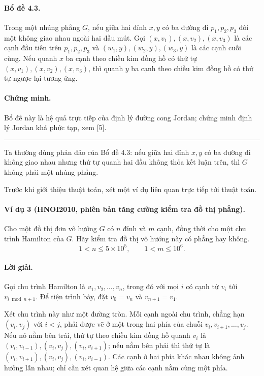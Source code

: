 \documentclass[11pt]{article}
\begin{document}
\paragraph{Bổ đề 4.3.}
Trong một nhúng phẳng $G$, nếu giữa hai đỉnh $x,y$ có ba đường đi
$p_1,p_2,p_3$ đôi một không giao nhau ngoài hai đầu mút. Gọi
$(x,v_1),(x,v_2),(x,v_3)$ là các cạnh đầu tiên trên $p_1,p_2,p_3$ và
$(w_1,y),(w_2,y),(w_3,y)$ là các cạnh cuối cùng. Nếu quanh $x$ ba cạnh theo
chiều kim đồng hồ có thứ tự $(x,v_1),(x,v_2),(x,v_3)$, thì quanh $y$ ba cạnh
theo chiều kim đồng hồ có thứ tự ngược lại tương ứng.

\paragraph{Chứng minh.}
Bổ đề này là hệ quả trực tiếp của định lý đường cong Jordan; chứng minh định lý
Jordan khá phức tạp, xem [5].
\hfill\rule{0.55em}{0.55em}

Ta thường dùng phản đảo của Bổ đề 4.3: nếu giữa hai đỉnh $x,y$ có ba đường đi
không giao nhau nhưng thứ tự quanh hai đầu không thỏa kết luận trên, thì $G$
không phải một nhúng phẳng.

Trước khi giới thiệu thuật toán, xét một ví dụ liên quan trực tiếp tới thuật
toán.

\paragraph{Ví dụ 3 (HNOI2010, phiên bản tăng cường kiểm tra đồ thị phẳng).}
Cho một đồ thị đơn vô hướng $G$ có $n$ đỉnh và $m$ cạnh, đồng thời cho một chu
trình Hamilton của $G$. Hãy kiểm tra đồ thị vô hướng này có phẳng hay không.
\[
  1<n\le 5\times 10^5,\qquad 1<m\le 10^6.
\]

\paragraph{Lời giải.}
Gọi chu trình Hamilton là $v_1,v_2,\ldots,v_n$, trong đó với mọi $i$ có cạnh từ
$v_i$ tới $v_{i\bmod n+1}$. Để tiện trình bày, đặt $v_0=v_n$ và $v_{n+1}=v_1$.

Xét chu trình này như một đường tròn. Mỗi cạnh ngoài chu trình, chẳng hạn
$(v_i,v_j)$ với $i<j$, phải được vẽ ở một trong hai phía của chuỗi
$v_i,v_{i+1},\ldots,v_j$. Nếu nó nằm bên trái, thứ tự theo chiều kim đồng hồ
quanh $v_i$ là $(v_i,v_{i-1}),(v_i,v_j),(v_i,v_{i+1})$; nếu nằm bên phải thì
thứ tự là $(v_i,v_{i+1}),(v_i,v_j),(v_i,v_{i-1})$. Các cạnh ở hai phía khác
nhau không ảnh hưởng lẫn nhau; chỉ cần xét quan hệ giữa các cạnh nằm cùng một
phía.
\end{document}
